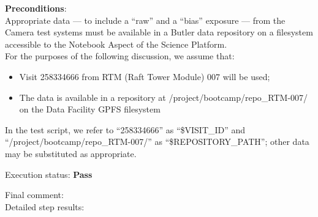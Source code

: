 \documentclass[DM,STR,toc]{lsstdoc}
\providecommand{\tightlist}{
  \setlength{\itemsep}{0pt}\setlength{\parskip}{0pt}}
\begin{document}
    {\bf Preconditions}:\\
    Appropriate data --- to include a ``raw'' and a ``bias'' exposure ---
from the Camera test systems must be available in a Butler data
repository on a filesystem accessible to the Notebook Aspect of the
Science Platform.\\[2\baselineskip]For the purposes of the following
discussion, we assume that:\\[2\baselineskip]

\begin{itemize}
\tightlist
\item
  Visit 258334666 from RTM (Raft Tower Module) 007 will be used;
\item
  The data is available in a repository at
  /project/bootcamp/repo\_RTM-007/ on the Data Facility GPFS filesystem
\end{itemize}

In the test script, we refer to ``258334666'' as ``\$VISIT\_ID'' and
``/project/bootcamp/repo\_RTM-007/'' as ``\$REPOSITORY\_PATH''; other
data may be substituted as appropriate.


    Execution status: {\bf Pass }

    Final comment:\\


    Detailed step results:
\end{document}
